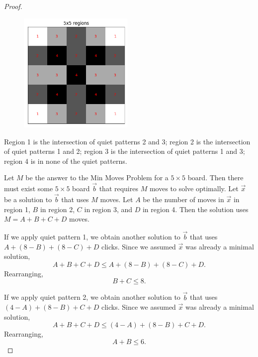 \documentclass[a4paper]{article}
\begin{document}
\begin{proof}
		\begin{figure}[H]
		\begin{center}
			\includegraphics[width=0.49\textwidth]{../../code/serialization/regions/5x5_regions.png}
		\end{center}
		\end{figure}
	
		Region 1 is the intersection of quiet patterns 2 and 3; region 2 is the intersection of quiet patterns 1 and 2; region 3 is the intersection of quiet patterns 1 and 3;
		region 4 is in none of the quiet patterns.
		
		Let $M$ be the answer to the Min Moves Problem for a $5 \times 5$ board.
		Then there must exist some $5 \times 5$ board $\vec{b}$ that requires $M$ moves to solve optimally.
		Let $\vec{x}$ be a solution to $\vec{b}$ that uses $M$ moves.
		Let $A$ be the number of moves in $\vec{x}$ in region 1, $B$ in region 2, $C$ in region 3, and $D$ in region 4.
		Then the solution uses $M = A + B + C + D$ moves.
		
		If we apply quiet pattern 1, we obtain another solution to $\vec{b}$ that uses $A + (8 - B) + (8 - C) + D$ clicks.
		Since we assumed $\vec{x}$ was already a minimal solution,
		\begin{equation*}
			A + B + C + D \leq A + (8 - B) + (8 - C) + D.
		\end{equation*}
		Rearranging,
		\begin{equation}\label{5x5_constr1}
			B + C \leq 8.
		\end{equation}
	
		If we apply quiet pattern 2, we obtain another solution to $\vec{b}$ that uses $(4 - A) + (8 - B) + C + D$ clicks.
		Since we assumed $\vec{x}$ was already a minimal solution,
		\begin{equation*}
			A + B + C + D \leq (4 - A) + (8 - B) + C + D.
		\end{equation*}
		Rearranging,
		\begin{equation}\label{5x5_constr2}
			A + B \leq 6.
		\end{equation}
	

\end{proof}
\end{document}
